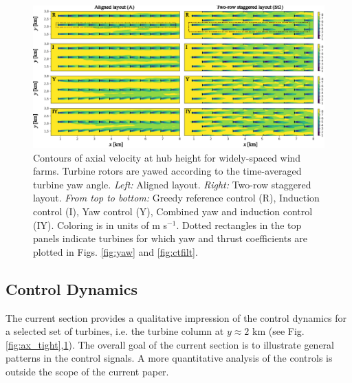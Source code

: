 \documentclass[a4paper]{jpconf}
\begin{document}
\begin{figure}[t]
	\includegraphics[width=\textwidth]{Torque18/wide_stat}
	\caption{Contours of axial velocity at hub height for widely-spaced wind farms. Turbine rotors are yawed according to the time-averaged turbine yaw angle. \emph{Left: } Aligned layout. \emph{Right: } Two-row staggered layout. \emph{From top to bottom:} Greedy reference control (R), Induction control (I), Yaw control (Y), Combined yaw and induction control (IY). Coloring is in units of m s$^{-1}$. Dotted rectangles in the top panels indicate turbines for which yaw and thrust coefficients are plotted in Figs. \ref{fig:yaw} and \ref{fig:ctfilt}. \label{fig:ax_wide}}	
\end{figure}

\subsection{Control Dynamics}
The current section provides a qualitative impression of the control dynamics for a selected set of turbines, i.e. the turbine column at $y \approx 2$ km (see Fig. \ref{fig:ax_tight},\ref{fig:ax_wide}). The overall goal of the current section is to illustrate general patterns in the control signals. A more quantitative analysis of the controls is outside the scope of the current paper. 
\end{document}
